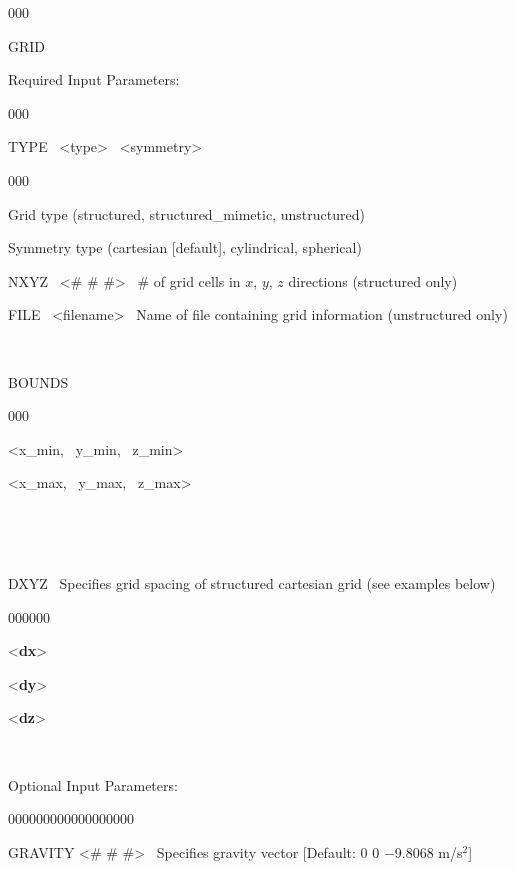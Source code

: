 \begin{deflist}{000}
\item[GRID]~
\item[Required Input Parameters:]~

\begin{deflist}{000}
\item[TYPE] \ <type> \ <symmetry>

\begin{deflist}{000}
\item Grid type (structured, structured\_mimetic, unstructured)

\item Symmetry type (cartesian [default], cylindrical, spherical)
\end{deflist}

\item[NXYZ] \ <\# \# \#> \ \# of grid cells in $x$, $y$, $z$ directions (structured only)

\item[FILE] \ <filename> \ Name of file containing grid information (unstructured only)

~\\

\noindent
\item[BOUNDS] ~
\begin{deflist}{000}
\item[<x\_min, \ y\_min, \ z\_min>]~
\item[<x\_max, \ y\_max, \ z\_max>]~
\end{deflist}
\item[\keyend] ~

~\\

\item[DXYZ] \ Specifies grid spacing of structured cartesian grid (see examples below)
\begin{deflist}{000000}
\item[<{\bf dx}>] ~
\item[<{\bf dy}>] ~
\item[<{\bf dz}>] ~
\end{deflist}
\item[\keyend] ~
\end{deflist}

\item[Optional Input Parameters:] ~

\begin{deflist}{000000000000000000}

\item[GRAVITY <\# \# \#>] \ Specifies gravity vector [Default: 0 0 $-$9.8068 m/s$^2$]


\end{deflist}
\end{deflist}
